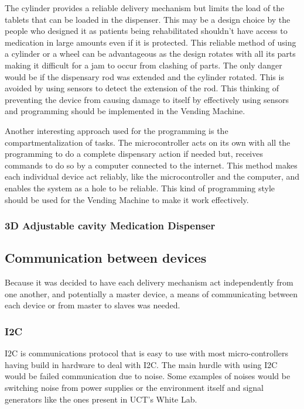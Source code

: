 \documentclass[a4paper,11pt]{article}
\numberwithin{figure}{subsection}
\begin{document}
The cylinder provides a reliable delivery mechanism but limits the load of the tablets that can be loaded in the dispenser. This may be a design choice by the people who designed it as patients being rehabilitated shouldn't have access to medication in large amounts even if it is protected. This reliable method of using a cylinder or a wheel can be advantageous as the design rotates with all its parts making it difficult for a jam to occur from clashing of parts. The only danger would be if the dispensary rod was extended and the cylinder rotated. This is avoided by using sensors to detect the extension of the rod. This thinking of preventing the device from causing damage to itself by effectively using sensors and programming should be implemented in the Vending Machine.

Another interesting approach used for the programming is the compartmentalization of tasks. The microcontroller acts on its own with all the programming to do a complete dispensary action if needed but, receives commands to do so by a computer connected to the internet. This method makes each individual device act reliably, like the microcontroller and the computer, and enables the system as a hole to be reliable. This kind of programming style should be used for the Vending Machine to make it work effectively.

\subsubsection{3D Adjustable cavity Medication Dispenser}
\label{subsec:med3}

\subsection{Communication between devices}
Because it was decided to have each delivery mechanism act independently from one another, and potentially a master device, a means of communicating between each device or from master to slaves was needed. 

\subsubsection{I2C}
I2C is communications protocol that is easy to use with most micro-controllers having build in hardware to deal with I2C. The main hurdle with using I2C would be failed communication due to noise. Some examples of noises would be switching noise from power supplies or the environment itself \cite{I2C} and signal generators like the ones present in UCT's White Lab.
\end{document}
